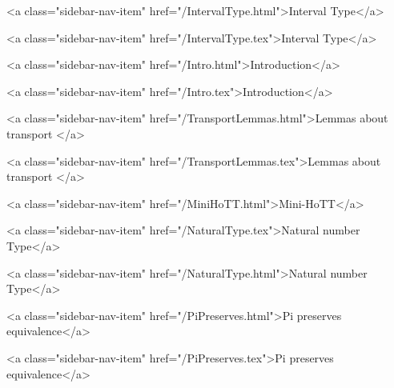       
        
          <a class="sidebar-nav-item" href="/IntervalType.html">Interval Type</a>
        
      
    
      
        
          <a class="sidebar-nav-item" href="/IntervalType.tex">Interval Type</a>
        
      
    
      
        
          <a class="sidebar-nav-item" href="/Intro.html">Introduction</a>
        
      
    
      
        
          <a class="sidebar-nav-item" href="/Intro.tex">Introduction</a>
        
      
    
      
        
          <a class="sidebar-nav-item" href="/TransportLemmas.html">Lemmas about transport </a>
        
      
    
      
        
          <a class="sidebar-nav-item" href="/TransportLemmas.tex">Lemmas about transport </a>
        
      
    
      
        
          <a class="sidebar-nav-item" href="/MiniHoTT.html">Mini-HoTT</a>
        
      
    
      
        
          <a class="sidebar-nav-item" href="/NaturalType.tex">Natural number Type</a>
        
      
    
      
        
          <a class="sidebar-nav-item" href="/NaturalType.html">Natural number Type</a>
        
      
    
      
        
          <a class="sidebar-nav-item" href="/PiPreserves.html">Pi preserves equivalence</a>
        
      
    
      
        
          <a class="sidebar-nav-item" href="/PiPreserves.tex">Pi preserves equivalence</a>
        
